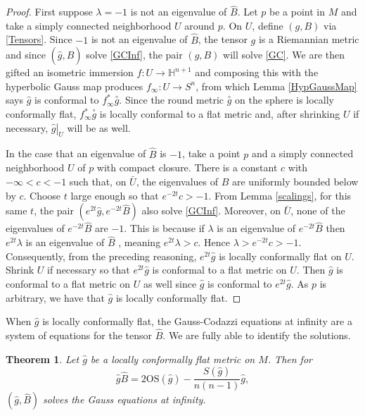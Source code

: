 \documentclass{amsart}
\newtheorem{thm}{Theorem}[section]
\renewcommand{\H}{\mathbb{H}}
\begin{document}
\begin{proof}
First suppose $\lambda = -1$ is not an eigenvalue of $\hat{B}$.
Let $p$ be a point in $M$ and take a simply connected neighborhood $U$ around $p$.
On $U$, define $(g,B)$ via \eqref{Tensors}.
Since $-1$ is not an eigenvalue of $\hat{B}$, the tensor $g$ is a Riemannian metric and since $(\hat{g},\hat{B})$ solve \ref{GCInf}, the pair $(g,B)$ will solve \ref{GC}.
We are then gifted an isometric immersion $f: U \to \H^{n+1}$ and composing this with the hyperbolic Gauss map produces $f_\infty:U \to S^n$, from which Lemma \ref{HypGaussMap} says $\hat{g}$ is conformal to $f_\infty^*\overset{\circ}{g}$.
Since the round metric $\overset{\circ}{g}$ on the sphere is locally conformally flat, $f_\infty^*\overset{\circ}{g}$ is locally conformal to a flat metric and, after shrinking $U$ if necessary, $\left.\hat{g}\right|_{U}$ will be as well. 

In the case that an eigenvalue of $\hat{B}$ is $-1$, take a point $p$ and a simply connected neighborhood $U$ of $p$ with compact closure.
There is a constant $c$ with $-\infty < c < -1$ such that, on $\bar{U}$, the eigenvalues of $\hat{B}$ are uniformly bounded below by $c$. 
Choose $t$ large enough so that $e^{-2t}c > -1$. 
From Lemma \ref{scalings}, for this same $t$, the pair $(e^{2t}\hat{g},e^{-2t}\hat{B})$ also solve \ref{GCInf}. 
Moreover, on $\bar{U}$, none of the eigenvalues of $e^{-2t}\hat{B}$ are $-1$. 
This is because if $\lambda$ is an eigenvalue of $e^{-2t}\hat{B}$ then $e^{2t}\lambda$ is an eigenvalue of $\hat{B}$ , meaning $e^{2t}\lambda > c$.
Hence $\lambda > e^{-2t}c > -1$.
Consequently, from the preceding reasoning, $e^{2t}\hat{g}$ is locally conformally flat on $U$.
Shrink $U$ if necessary so that $e^{2t}\hat{g}$ is conformal to a flat metric on $U$. 
Then $\hat{g}$ is conformal to a flat metric on $U$ as well since $\hat{g}$ is conformal to $e^{2t}\hat{g}$.
As $p$ is arbitrary, we have that $\hat{g}$ is locally conformally flat. 
\end{proof}

When $\hat{g}$ is locally conformally flat, the Gauss-Codazzi equations at infinity are a system of equations for the tensor $\hat{B}$.
We are fully able to identify the solutions.


\begin{thm}
\label{MainThmGauss}
Let $\hat{g}$ be a locally conformally flat metric on $M$. Then for 
\[
\hat{g} \hat{B} = 2\mathrm{OS}(\hat{g}) - \frac{S(\hat{g})}{n(n-1)}\hat{g},
\]
$(\hat{g},\hat{B})$ solves the Gauss equations at infinity.
\end{thm}
\end{document}
